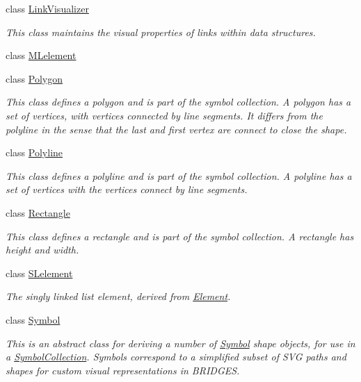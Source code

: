\begin{DoxyCompactItemize}
class \mbox{\hyperlink{classbridges_1_1datastructure_1_1_link_visualizer}{Link\+Visualizer}}
\begin{DoxyCompactList}\small\item\em This class maintains the visual properties of links within data structures. \end{DoxyCompactList}\item 
class \mbox{\hyperlink{classbridges_1_1datastructure_1_1_m_lelement}{M\+Lelement}}
\item 
class \mbox{\hyperlink{classbridges_1_1datastructure_1_1_polygon}{Polygon}}
\begin{DoxyCompactList}\small\item\em This class defines a polygon and is part of the symbol collection. A polygon has a set of vertices, with vertices connected by line segments. It differs from the polyline in the sense that the last and first vertex are connect to close the shape. \end{DoxyCompactList}\item 
class \mbox{\hyperlink{classbridges_1_1datastructure_1_1_polyline}{Polyline}}
\begin{DoxyCompactList}\small\item\em This class defines a polyline and is part of the symbol collection. A polyline has a set of vertices with the vertices connect by line segments. \end{DoxyCompactList}\item 
class \mbox{\hyperlink{classbridges_1_1datastructure_1_1_rectangle}{Rectangle}}
\begin{DoxyCompactList}\small\item\em This class defines a rectangle and is part of the symbol collection. A rectangle has height and width. \end{DoxyCompactList}\item 
class \mbox{\hyperlink{classbridges_1_1datastructure_1_1_s_lelement}{S\+Lelement}}
\begin{DoxyCompactList}\small\item\em The singly linked list element, derived from \mbox{\hyperlink{classbridges_1_1datastructure_1_1_element}{Element}}. \end{DoxyCompactList}\item 
class \mbox{\hyperlink{classbridges_1_1datastructure_1_1_symbol}{Symbol}}
\begin{DoxyCompactList}\small\item\em This is an abstract class for deriving a number of \mbox{\hyperlink{classbridges_1_1datastructure_1_1_symbol}{Symbol}} shape objects, for use in a \mbox{\hyperlink{classbridges_1_1datastructure_1_1_symbol_collection}{Symbol\+Collection}}. Symbols correspond to a simplified subset of S\+VG paths and shapes for custom visual representations in B\+R\+I\+D\+G\+ES. \end{DoxyCompactList}\item 

\end{DoxyCompactItemize}
